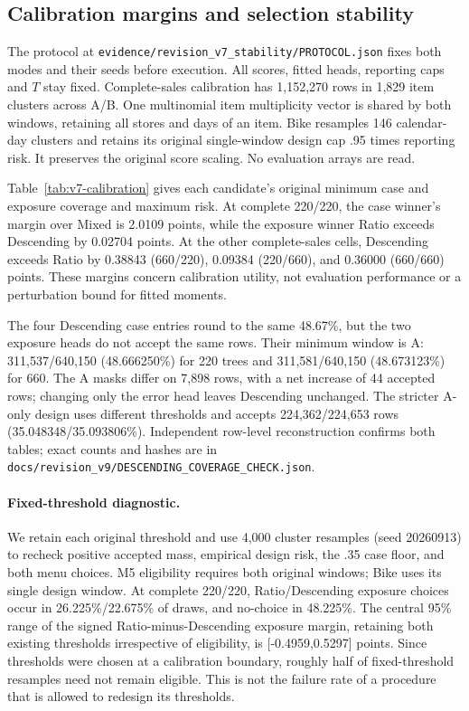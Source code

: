 \subsection{Calibration margins and selection stability}
\label{app:v7-stability}
The protocol at \texttt{evidence/revision\_v7\_stability/PROTOCOL.json} fixes both modes and their seeds before execution. All scores, fitted heads, reporting caps and $T$ stay fixed. Complete-sales calibration has 1,152,270 rows in 1,829 item clusters across A/B. One multinomial item multiplicity vector is shared by both windows, retaining all stores and days of an item. Bike resamples 146 calendar-day clusters and retains its original single-window design cap .95 times reporting risk. It preserves the original score scaling. No evaluation arrays are read.

Table~\ref{tab:v7-calibration} gives each candidate's original minimum case and exposure coverage and maximum risk. At complete 220/220, the case winner's margin over Mixed is 2.0109 points, while the exposure winner Ratio exceeds Descending by 0.02704 points. At the other complete-sales cells, Descending exceeds Ratio by 0.38843 (660/220), 0.09384 (220/660), and 0.36000 (660/660) points. These margins concern calibration utility, not evaluation performance or a perturbation bound for fitted moments.

The four Descending case entries round to the same 48.67\%, but the two exposure heads do not accept the same rows. Their minimum window is A: 311,537/640,150 (48.666250\%) for 220 trees and 311,581/640,150 (48.673123\%) for 660. The A masks differ on 7,898 rows, with a net increase of 44 accepted rows; changing only the error head leaves Descending unchanged. The stricter A-only design uses different thresholds and accepts 224,362/224,653 rows (35.048348/35.093806\%). Independent row-level reconstruction confirms both tables; exact counts and hashes are in \texttt{docs/revision\_v9/DESCENDING\_COVERAGE\_CHECK.json}.

\paragraph{Fixed-threshold diagnostic.}
We retain each original threshold and use 4,000 cluster resamples (seed 20260913) to recheck positive accepted mass, empirical design risk, the .35 case floor, and both menu choices. M5 eligibility requires both original windows; Bike uses its single design window. At complete 220/220, Ratio/Descending exposure choices occur in 26.225\%/22.675\% of draws, and no-choice in 48.225\%. The central 95\% range of the signed Ratio-minus-Descending exposure margin, retaining both existing thresholds irrespective of eligibility, is [-0.4959,0.5297] points. Since thresholds were chosen at a calibration boundary, roughly half of fixed-threshold resamples need not remain eligible. This is not the failure rate of a procedure that is allowed to redesign its thresholds.

